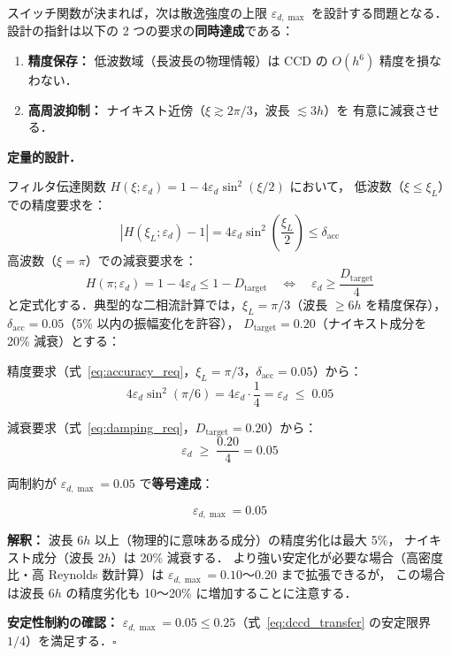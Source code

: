 スイッチ関数が決まれば，次は散逸強度の上限 $\varepsilon_{d,\max}$ を設計する問題となる．
設計の指針は以下の 2 つの要求の\textbf{同時達成}である：
\begin{enumerate}[label=(\alph*)]
  \item \textbf{精度保存：} 低波数域（長波長の物理情報）は CCD の $O(h^6)$ 精度を損なわない．
  \item \textbf{高周波抑制：} ナイキスト近傍（$\xi \gtrsim 2\pi/3$，波長 $\lesssim 3h$）を
        有意に減衰させる．
\end{enumerate}

\medskip
\noindent\textbf{定量的設計．}

フィルタ伝達関数 $H(\xi;\varepsilon_d) = 1 - 4\varepsilon_d\sin^2(\xi/2)$ において，
低波数（$\xi \leq \xi_L$）での精度要求を：
\begin{equation}
  |H(\xi_L;\varepsilon_d) - 1| = 4\varepsilon_d\sin^2\!\left(\frac{\xi_L}{2}\right) \leq \delta_\mathrm{acc}
  \label{eq:accuracy_req}
\end{equation}
高波数（$\xi = \pi$）での減衰要求を：
\begin{equation}
  H(\pi;\varepsilon_d) = 1 - 4\varepsilon_d \leq 1 - D_\mathrm{target}
  \quad\Leftrightarrow\quad
  \varepsilon_d \geq \frac{D_\mathrm{target}}{4}
  \label{eq:damping_req}
\end{equation}
と定式化する．典型的な二相流計算では，$\xi_L = \pi/3$（波長 $\geq 6h$ を精度保存），
$\delta_\mathrm{acc} = 0.05$（5\% 以内の振幅変化を許容），
$D_\mathrm{target} = 0.20$（ナイキスト成分を 20\% 減衰）とする：

\begin{tcolorbox}[resultbox, title={$\varepsilon_{d,\max}$ の設計値と設計根拠}]
\label{box:eps_design}
精度要求（式~\eqref{eq:accuracy_req}，$\xi_L = \pi/3$，$\delta_\mathrm{acc}=0.05$）から：
\begin{equation}
  4\varepsilon_d\sin^2(\pi/6) = 4\varepsilon_d\cdot\frac{1}{4} = \varepsilon_d \;\leq\; 0.05
  \label{eq:eps_bound_accuracy}
\end{equation}

減衰要求（式~\eqref{eq:damping_req}，$D_\mathrm{target}=0.20$）から：
\begin{equation}
  \varepsilon_d \;\geq\; \frac{0.20}{4} = 0.05
  \label{eq:eps_bound_damping}
\end{equation}

両制約が $\varepsilon_{d,\max} = 0.05$ で\textbf{等号達成}：

\begin{equation}
  \boxed{\varepsilon_{d,\max} = 0.05}
  \label{eq:eps_max}
\end{equation}

\textbf{解釈：}
波長 $6h$ 以上（物理的に意味ある成分）の精度劣化は最大 5\%，
ナイキスト成分（波長 $2h$）は 20\% 減衰する．
より強い安定化が必要な場合（高密度比・高 Reynolds 数計算）は
$\varepsilon_{d,\max} = 0.10$〜$0.20$ まで拡張できるが，
この場合は波長 $6h$ の精度劣化も 10〜20\% に増加することに注意する．

\medskip
\textbf{安定性制約の確認：}
$\varepsilon_{d,\max} = 0.05 \leq 0.25$（式~\eqref{eq:dccd_transfer} の安定限界 $1/4$）を満足する．$\square$
\end{tcolorbox}

